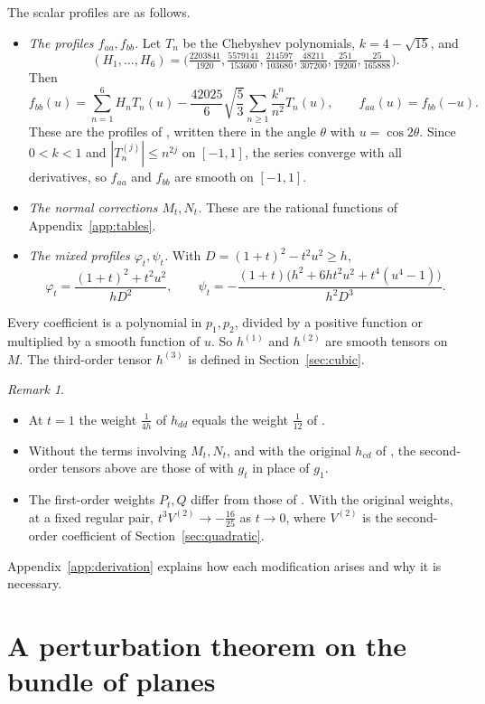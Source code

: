 \documentclass[11pt]{amsart}
\theoremstyle{definition}
\theoremstyle{remark}
\newtheorem{remark}[theorem]{Remark}
\begin{document}
The scalar profiles are as follows.
\begin{itemize}[leftmargin=*]
\item \emph{The profiles $f_{aa},f_{bb}$.} Let $T_n$ be the Chebyshev polynomials, $k=4-\sqrt{15}$, and
\[ (H_1,\dots,H_6)=\Big(\tfrac{2203841}{1920},\tfrac{5579141}{153600},\tfrac{214597}{103680},\tfrac{48211}{307200},\tfrac{251}{19200},\tfrac{25}{165888}\Big). \]
Then
\[ f_{bb}(u)=\sum_{n=1}^{6}H_nT_n(u)-\frac{42025}{6}\sqrt{\frac53}\sum_{n\ge1}\frac{k^n}{n^2}T_n(u),\qquad f_{aa}(u)=f_{bb}(-u). \]
These are the profiles of \cite[\S5]{BH}, written there in the angle $\theta$ with $u=\cos2\theta$. Since $0<k<1$ and $|T_n^{(j)}|\le n^{2j}$ on $[-1,1]$, the series converge with all derivatives, so $f_{aa}$ and $f_{bb}$ are smooth on $[-1,1]$.
\item \emph{The normal corrections $M_t,N_t$.} These are the rational functions of Appendix~\ref{app:tables}.
\item \emph{The mixed profiles $\varphi_t,\psi_t$.} With $D=(1+t)^2-t^2u^2\ge h$,
\[ \varphi_t=\frac{(1+t)^2+t^2u^2}{hD^2},\qquad \psi_t=-\frac{(1+t)\big(h^2+6ht^2u^2+t^4(u^4-1)\big)}{h^2D^3}. \]
\end{itemize}

Every coefficient is a polynomial in $p_1,p_2$, divided by a positive function or multiplied by a smooth function of $u$. So $h^{(1)}$ and $h^{(2)}$ are smooth tensors on $M$. The third-order tensor $h^{(3)}$ is defined in Section~\ref{sec:cubic}.

\begin{remark}\label{rem:BH}
\begin{itemize}[leftmargin=*]
\item At $t=1$ the weight $\frac1{4h}$ of $h_{dd}$ equals the weight $\frac1{12}$ of \cite{BH}.
\item Without the terms involving $M_t,N_t$, and with the original $h_{cd}$ of \cite{BH}, the second-order tensors above are those of \cite[\S5]{BH} with $g_t$ in place of $g_1$.
\item The first-order weights $P_t,Q$ differ from those of \cite{BH}. With the original weights, at a fixed regular pair, $t^3V^{(2)}\to-\frac{16}{25}$ as $t\to0$, where $V^{(2)}$ is the second-order coefficient of Section~\ref{sec:quadratic}.
\end{itemize}
Appendix~\ref{app:derivation} explains how each modification arises and why it is necessary.
\end{remark}

\section{A perturbation theorem on the bundle of planes}\label{sec:abstract}
\end{document}
